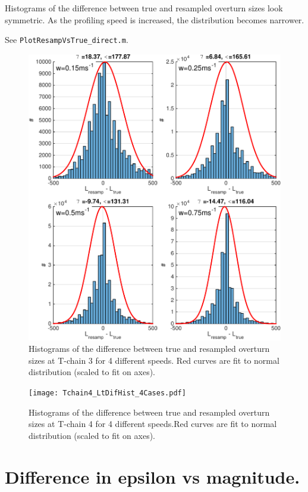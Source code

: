 \documentclass[11pt]{article}
\begin{document}
Histograms of the difference between true and resampled overturn sizes look symmetric. As the profiling speed is increased, the distribution becomes narrower.

See \verb+PlotResampVsTrue_direct.m+.


\begin{figure}[htbp]
\includegraphics[scale=0.8]{Tchain3_LtDifHist_4Cases.pdf}
\caption{Histograms of the difference between true and resampled overturn sizes at T-chain 3 for 4 different speeds. Red curves are fit to normal distribution (scaled to fit on axes).}
\label{}
\end{figure}

\begin{figure}[htbp]
\texttt{[image: Tchain4\_LtDifHist\_4Cases.pdf]}
\caption{Histograms of the difference between true and resampled overturn sizes at T-chain 4 for 4 different speeds.Red curves are fit to normal distribution (scaled to fit on axes).}
\label{}
\end{figure}



\newpage
\clearpage
\section{Difference in epsilon vs magnitude.}
\end{document}
